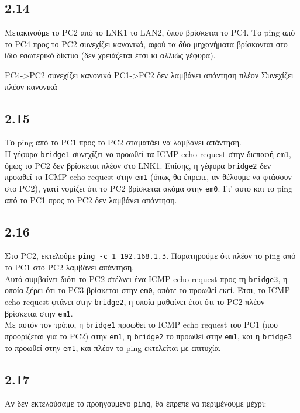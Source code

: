 \documentclass[a4paper, 12pt]{article}
\begin{document}
	\subsection*{2.14}
		Μετακινούμε το PC2 από το LNK1 το LAN2, όπου βρίσκεται το PC4. Το ping από το PC4 προς το PC2 συνεχίζει κανονικά, αφού τα δύο μηχανήματα βρίσκονται στο ίδιο εσωτερικό δίκτυο (δεν χρειάζεται έτσι κι αλλιώς γέφυρα).
		
				PC4->PC2 συνεχίζει κανονικά
				PC1->PC2 δεν λαμβάνει απάντηση πλέον
		Συνεχίζει πλέον κανονικά

	\subsection*{2.15}
		Το ping από το PC1 προς το PC2 σταματάει να λαμβάνει απάντηση. \\
		
		Η γέφυρα \verb|bridge1| συνεχίζει να προωθεί τα ICMP echo request στην διεπαφή \verb|em1|, όμως το PC2 δεν βρίσκεται πλέον στο LNK1. Επίσης, η γέφυρα \verb|bridge2| δεν προωθεί τα ICMP echo request στην \verb|em1| (όπως θα έπρεπε, αν θέλουμε να φτάσουν στο PC2), γιατί νομίζει ότι το PC2 βρίσκεται ακόμα στην \verb|em0|. Γι' αυτό και το ping από το PC1 προς το PC2 δεν λαμβάνει απάντηση.  

	\subsection*{2.16}
		Στο PC2, εκτελούμε \verb|ping -c 1 192.168.1.3|. Παρατηρούμε ότι πλέον το ping από το PC1 στο PC2 λαμβάνει απάντηση. \\
		
		Αυτό συμβαίνει διότι το PC2 στέλνει ένα ICMP echo request προς τη \verb|bridge3|, η οποία ξέρει ότι το PC3 βρίσκεται στην \verb|em0|, οπότε το προωθεί εκεί. Έτσι, το ICMP echo request φτάνει στην \verb|bridge2|, η οποία μαθαίνει έτσι ότι το PC2 πλέον βρίσκεται στην \verb|em1|. \\
		
		Με αυτόν τον τρόπο, η \verb|bridge1| προωθεί το ICMP echo request του PC1 (που προορίζεται για το PC2) στην \verb|em1|, η \verb|bridge2| το προωθεί στην \verb|em1|, και η \verb|bridge3| το προωθεί στην \verb|em1|, και πλέον το ping εκτελείται με επιτυχία.

	\subsection*{2.17}
		Αν δεν εκτελούσαμε το προηγούμενο \verb|ping|, θα έπρεπε να περιμένουμε μέχρι:
		
\end{document}
